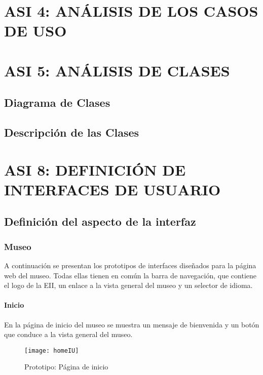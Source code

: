 \newpage
\section{ASI 4: ANÁLISIS DE LOS CASOS DE USO}



\newpage
\section{ASI 5: ANÁLISIS DE CLASES}

\subsection{Diagrama de Clases} 

\subsection{Descripción de las Clases}


\newpage
\section{ASI 8: DEFINICIÓN DE INTERFACES DE USUARIO}


\subsection{Definición del aspecto de la interfaz}

\subsubsection{Museo}
A continuación se presentan los prototipos de interfaces diseñados para la página web del museo. Todas ellas tienen en común la barra de navegación, que contiene el logo de la EII, un enlace a la vista general del museo y un selector de idioma.
\paragraph*{Inicio}
En la página de inicio del museo se muestra un mensaje de bienvenida y un botón que conduce a la vista general del museo.
\begin{figure}[H]
\centering
\texttt{[image: homeIU]}
\caption{Prototipo: Página de inicio}
\end{figure}
